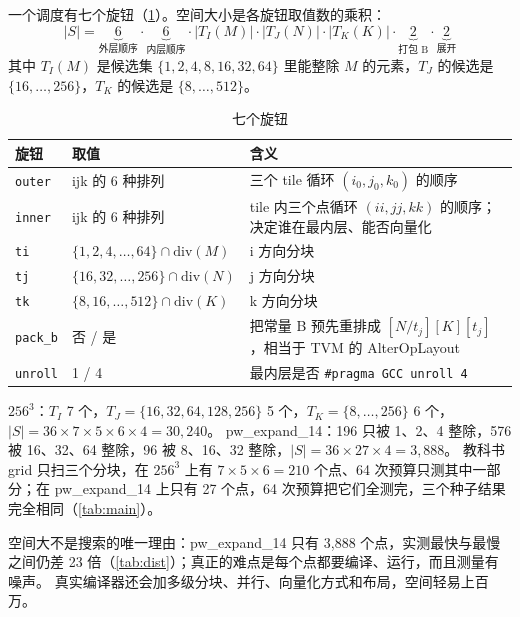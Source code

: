 \documentclass[11pt,a4paper]{ctexart}
\begin{document}
一个调度有七个旋钮（\cref{tab:knobs}）。空间大小是各旋钮取值数的乘积：
\begin{equation*}\label{eq:space}
  |S| = \underbrace{6}_{\text{外层顺序}}\cdot\underbrace{6}_{\text{内层顺序}}\cdot|T_I(M)|\cdot|T_J(N)|\cdot|T_K(K)|\cdot\underbrace{2}_{\text{打包 B}}\cdot\underbrace{2}_{\text{展开}} \tag{E22}
\end{equation*}
其中 $T_I(M)$ 是候选集 $\{1,2,4,8,16,32,64\}$ 里能整除 $M$ 的元素，$T_J$ 的候选是 $\{16,\dots,256\}$，$T_K$ 的候选是 $\{8,\dots,512\}$。

\begin{table}[H]
\centering\small
\caption{七个旋钮}\label{tab:knobs}
\begin{tabularx}{\linewidth}{l l >{\raggedright\arraybackslash}X}
\toprule
旋钮 & 取值 & 含义 \\
\midrule
\texttt{outer} & ijk 的 6 种排列 & 三个 tile 循环 $(i_0, j_0, k_0)$ 的顺序 \\
\texttt{inner} & ijk 的 6 种排列 & tile 内三个点循环 $(ii, jj, kk)$ 的顺序；决定谁在最内层、能否向量化 \\
\texttt{ti} & $\{1,2,4,\dots,64\}\cap\mathrm{div}(M)$ & i 方向分块 \\
\texttt{tj} & $\{16,32,\dots,256\}\cap\mathrm{div}(N)$ & j 方向分块 \\
\texttt{tk} & $\{8,16,\dots,512\}\cap\mathrm{div}(K)$ & k 方向分块 \\
\texttt{pack\_b} & 否 / 是 & 把常量 B 预先重排成 $[N/t_j][K][t_j]$，相当于 TVM 的 AlterOpLayout \\
\texttt{unroll} & 1 / 4 & 最内层是否 \texttt{\#pragma GCC unroll 4} \\
\bottomrule
\end{tabularx}
\end{table}

$256^3$：$T_I$ 7 个，$T_J = \{16,32,64,128,256\}$ 5 个，$T_K=\{8,\dots,256\}$ 6 个，$|S| = 36\times7\times5\times6\times4 = 30{,}240$。
pw\_expand\_14：196 只被 1、2、4 整除，576 被 16、32、64 整除，96 被 8、16、32 整除，$|S| = 36\times27\times4 = 3{,}888$。
教科书 grid 只扫三个分块，在 $256^3$ 上有 $7\times5\times6 = 210$ 个点、64 次预算只测其中一部分；在 pw\_expand\_14 上只有 27 个点，64 次预算把它们全测完，三个种子结果完全相同（\cref{tab:main}）。

空间大不是搜索的唯一理由：pw\_expand\_14 只有 3,888 个点，实测最快与最慢之间仍差 23 倍（\cref{tab:dist}）；真正的难点是每个点都要编译、运行，而且测量有噪声。
真实编译器还会加多级分块、并行、向量化方式和布局，空间轻易上百万。
\end{document}
